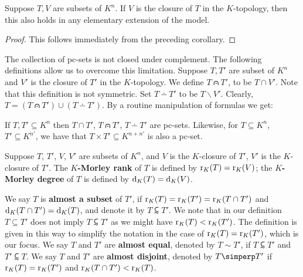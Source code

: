\begin{cor} \label{ClosurePreserve}
Suppose $T, V$ are subsets of $K^n$. If $V$ is the closure of $T$ in the $K$-topology, then this also holds in any elementary extension of the model.
\end{cor}

\begin{proof}
This follows immediately from the preceding corollary.
\end{proof}

\noindent
The collection of pc-sets is not closed under complement. The following definitions allow us to overcome this limitation.
Suppose $T,T'$ are subset of $K^n$ and $V'$ is the closure of $T'$ in the $K$-topology. We define $T \capdot T'$, to be $T \cap V'$. Note that this definition is not symmetric. Set $T \dotminus T'$ to be $ T \backslash V'$. Clearly, $T = (T \capdot T') \cup (T \dotminus T')$.
By a routine manipulation of formulas we get:
 
\begin{lem} 
If $T, T' \subseteq K^n$ then $T \cap T'$, $T \capdot T'$, $T \dotminus T'$ are pc-sets. Likewise, for $T \subseteq K^n$, $T'\subseteq K^{n'}$, we have that $ T \times T' \subseteq K^{n+n'}$ is also a pc-set.
\end{lem}

\noindent
Suppose $T$, $T'$, $V$, $V'$ are subsets of $K^n$, and $V$ is the $K$-closure of $T'$, $V'$ is the $K$-closure of $T'$. The {\bf$K$-Morley rank} of $T$ is defined by $\mathrm{r}_K(T)= \mathrm{r}_K(V)$; the {\bf$K$-Morley degree}  of $T$ is defined by $\mathrm{d}_K(T)=\mathrm{d}_K(V)$.



We say $T$ is {\bf almost a subset} of $T'$, if  $\mathrm{r}_K(T) = \mathrm{r}_K(T') =\mathrm{r}_K(T \cap T')$ and $\mathrm{d}_K(T\cap T') =\mathrm{d}_K(T)$, and denote it by $T  \subsim T'$. We note that in our definition $T\subseteq T'$ does not imply $T \subsim T'$ as we might have $\mathrm{r}_K(T) < \mathrm{r}_K(T')$. The definition is given in this way to simplify the notation in the case of $\mathrm{r}_K(T) =\mathrm{r}_K(T')$, which is our focus.
We say $T$ and $T'$ are {\bf almost equal}, denoted by $T\sim T'$, if $T \subsim T'$ and $T' \subsim T$. We say $T$ and $T'$ are { \bf almost disjoint}, denoted by $T \simperp T'$ if $\mathrm{r}_K(T)=\mathrm{r}_K(T')$ and $\mathrm{r}_K(T\cap T')< \mathrm{r}_K(T)$.

